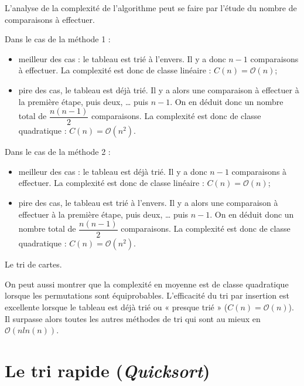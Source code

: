 \documentclass[10pt,fleqn]{article} %
\begin{document}
L’analyse de la complexité de l’algorithme peut se faire par l’étude du nombre de comparaisons à effectuer.

Dans le cas de la méthode 1 : 
\begin{itemize}
\item meilleur des cas : le tableau est trié à l’envers. Il y a donc $n - 1$ comparaisons à effectuer. La complexité est donc de classe linéaire : $C(n)=\mathcal{O}(n)$;
\item pire des cas, le tableau est déjà trié. Il y a alors une comparaison à effectuer à la première étape, puis deux, … puis $n-1$. On en déduit donc un nombre total de $\dfrac{n\left(n-1\right)}{2}$ comparaisons. La complexité est donc de classe quadratique : $C(n)=\mathcal{O}\left(n^2\right)$.
\end{itemize}

Dans le cas de la méthode 2 : 
\begin{itemize}
\item meilleur des cas : le tableau est déjà trié. Il y a donc $n - 1$ comparaisons à effectuer. La complexité est donc de classe linéaire : $C(n)=\mathcal{O}(n)$;
\item pire des cas, le tableau est trié à l’envers. Il y a alors une comparaison à effectuer à la première étape, puis deux, … puis $n-1$. On en déduit donc un nombre total de $\dfrac{n\left(n-1\right)}{2}$  comparaisons. La complexité est donc de classe quadratique : $C(n)=\mathcal{O}\left(n^2\right)$.


\end{itemize}


\begin{exemple}
Le tri de cartes.
\end{exemple}

\begin{rem}
On peut aussi montrer que la complexité en moyenne est de classe quadratique lorsque les permutations sont équiprobables. L’efficacité du tri par insertion est excellente lorsque le tableau est déjà trié ou « presque trié » ($C(n)=\mathcal{O}\left(n\right)$). Il surpasse alors toutes les autres méthodes de tri qui sont au mieux en $\mathcal{O}\left(n ln(n)\right)$.
\end{rem}

\section{Le tri rapide (\textit{Quicksort})}
\end{document}
